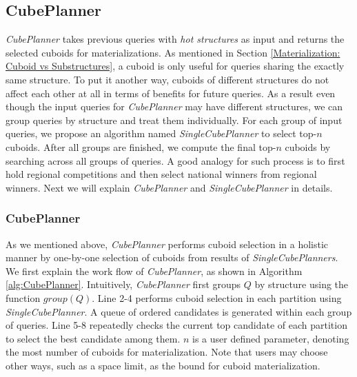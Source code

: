 	\subsection{CubePlanner}
	
	\emph{CubePlanner} takes previous queries with \emph{hot structures} as input and returns the selected cuboids for materializations. As mentioned in Section \ref{Materialization: Cuboid vs Substructures}, a cuboid is only useful for queries sharing the exactly same structure. To put it another way, cuboids of different structures do not affect each other at all in terms of benefits for future queries. As a result even though the input queries for \emph{CubePlanner} may have different structures, we can group queries by structure and treat them individually. For each group of input queries, we propose an algorithm named \emph{SingleCubePlanner} to select top-$n$ cuboids. After all groups are finished, we compute the final top-$n$ cuboids by searching across all groups of queries. A good analogy for such process is to first hold regional competitions and then select national winners from regional winners. Next we will explain \emph{CubePlanner} and \emph{SingleCubePlanner} in details.
	
	\subsubsection{CubePlanner}
	\label{CubePlanner}
	
	As we mentioned above, \emph{CubePlanner} performs cuboid selection in a holistic manner by one-by-one selection of cuboids from results of \emph{SingleCubePlanners}. We first explain the work flow of \emph{CubePlanner}, as shown in Algorithm \ref{alg:CubePlanner}. %
	Intuitively, \emph{CubePlanner} first groups $Q$ by structure using the function $group(Q)$. Line 2-4 performs cuboid selection in each partition using \emph{SingleCubePlanner}. A queue of ordered candidates is generated within each group of queries. Line 5-8 repeatedly checks the current top candidate of each partition to select the best candidate among them. $n$ is a user defined parameter, denoting the most number of cuboids for materialization.  Note that users may choose other ways, such as a space limit, as the bound for cuboid materialization.
	
